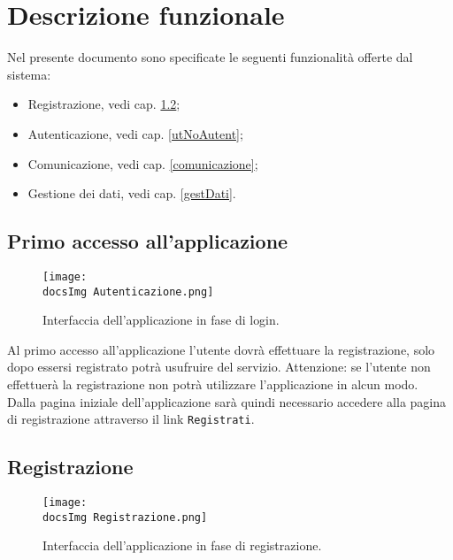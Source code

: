 \section{Descrizione funzionale}\label{desFunz}{
{
Nel presente documento sono specificate le seguenti funzionalità offerte dal sistema:
\begin{itemize}
	\item Registrazione, vedi cap. \ref{registrazione};
	\item Autenticazione, vedi cap. \ref{utNoAutent};
	\item Comunicazione, vedi cap. \ref{comunicazione};
	\item Gestione dei dati, vedi cap. \ref{gestDati}.
\end{itemize}
}

\subsection{Primo accesso all’applicazione}{
\begin{figure}[h!]
	\centering
		\texttt{[image: \\docsImg Autenticazione.png]}
		\caption{Interfaccia dell'applicazione in fase di login.} 
		\label{fig:imgLogin}
	\end{figure}
Al primo accesso all'applicazione l'utente dovrà effettuare la registrazione, solo dopo essersi registrato potrà usufruire del servizio. Attenzione: se l'utente non effettuerà la registrazione non potrà utilizzare l'applicazione in alcun modo.\\
Dalla pagina iniziale dell’applicazione sarà quindi necessario accedere alla pagina di registrazione attraverso il link \texttt{Registrati}.	

	}
\newpage	
\subsection{Registrazione}\label{registrazione}{

\begin{figure}[h!]
	\centering
		\texttt{[image: \\docsImg Registrazione.png]}
		\caption{Interfaccia dell'applicazione in fase di registrazione.}
		\label{fig:imgReg} 
	\end{figure}

}}
